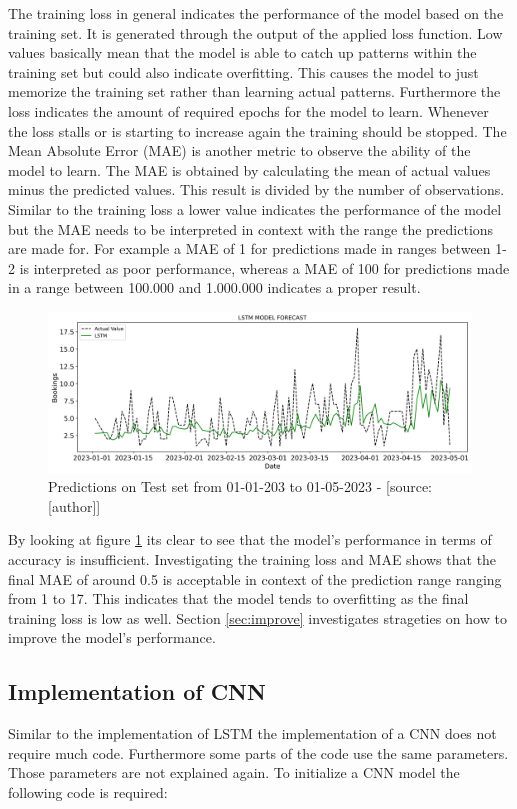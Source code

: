 The training loss in general indicates the performance of the model based on the training set. It is generated through the output of the applied loss function. Low values basically mean that the model is able to catch up patterns within the training set but could also indicate overfitting. This causes the model to just memorize the training set rather than learning actual patterns. Furthermore the loss indicates the amount of required epochs for the model to learn. Whenever the loss stalls or is starting to increase again the training should be stopped. The Mean Absolute Error (MAE) is another metric to observe the ability of the model to learn. The MAE is obtained by calculating the mean of actual values minus the predicted values. This result is divided by the number of observations.\cite{mae} Similar to the training loss a lower value indicates the performance of the model but the MAE needs to be interpreted in context with the range the predictions are made for. For example a MAE of 1 for predictions made in ranges between 1-2 is interpreted as poor performance, whereas a MAE of 100 for predictions made in a range between 100.000 and 1.000.000 indicates a proper result.

\begin{figure}[H]
	\centering
		\includegraphics[width=14cm]{images/paper_1_lstm_1_prediction}
	\caption{Predictions on Test set from 01-01-203 to 01-05-2023 - [source:[author]]}
	\label{fig:lstm_1_training_test}
\end{figure}
By looking at figure \ref{fig:lstm_1_training_test} its clear to see that the model's performance in terms of accuracy is insufficient. Investigating the training loss and MAE shows that the final MAE of around 0.5 is acceptable in context of the prediction range ranging from 1 to 17. This indicates that the model tends to overfitting as the final training loss is low as well. Section \ref{sec:improve} investigates strageties on how to improve the model's performance.

\subsection{Implementation of CNN}
Similar to the implementation of LSTM the implementation of a CNN does not require much code. Furthermore some parts of the code use the same parameters. Those parameters are not explained again. To initialize a CNN model the following code is required: 

